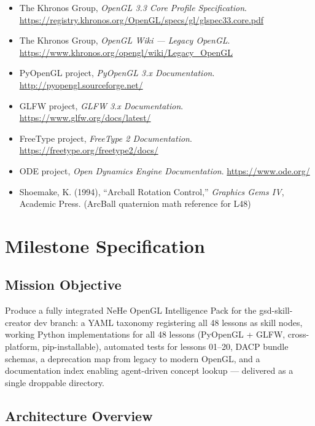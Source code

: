 \documentclass[11pt,letterpaper]{article}
\newcommand{\stageheader}[2]{%
  \noindent\colorbox{#2}{\makebox[\textwidth][l]{%
    \textcolor{white}{\bfseries\sffamily\hspace{6pt}#1\hspace{6pt}}}}%
  \vspace{0.5em}\par%
}
\begin{document}
\begin{itemize}
\item The Khronos Group, \textit{OpenGL 3.3 Core Profile Specification}. \url{https://registry.khronos.org/OpenGL/specs/gl/glspec33.core.pdf}
\item The Khronos Group, \textit{OpenGL Wiki --- Legacy OpenGL}. \url{https://www.khronos.org/opengl/wiki/Legacy_OpenGL}
\item PyOpenGL project, \textit{PyOpenGL 3.x Documentation}. \url{http://pyopengl.sourceforge.net/}
\item GLFW project, \textit{GLFW 3.x Documentation}. \url{https://www.glfw.org/docs/latest/}
\item FreeType project, \textit{FreeType 2 Documentation}. \url{https://freetype.org/freetype2/docs/}
\item ODE project, \textit{Open Dynamics Engine Documentation}. \url{https://www.ode.org/}
\item Shoemake, K. (1994), ``Arcball Rotation Control,'' \textit{Graphics Gems IV}, Academic Press. (ArcBall quaternion math reference for L48)
\end{itemize}

\newpage

\stageheader{STAGE 3 --- MISSION PACKAGE}{tertiary}

\section{Milestone Specification}

\subsection{Mission Objective}

Produce a fully integrated NeHe OpenGL Intelligence Pack for the gsd-skill-creator dev branch: a YAML taxonomy registering all 48 lessons as skill nodes, working Python implementations for all 48 lessons (PyOpenGL + GLFW, cross-platform, pip-installable), automated tests for lessons 01--20, DACP bundle schemas, a deprecation map from legacy to modern OpenGL, and a documentation index enabling agent-driven concept lookup --- delivered as a single droppable directory.

\subsection{Architecture Overview}
\end{document}

